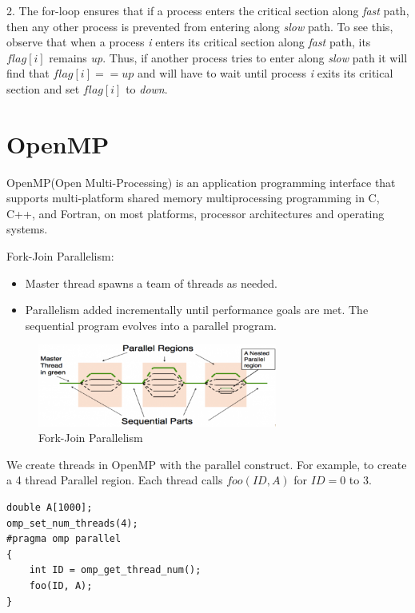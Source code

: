 \documentclass[twoside]{article}
\begin{document}
\setlength{\parindent}{2em} 2. The for-loop ensures that if a process enters the critical section along {\it fast} path, then any other process is prevented from entering along {\it slow} path. To see this, observe that when a process {\it i} enters its critical section along {\it fast} path, its $flag[i]$ remains {\it up}. Thus, if another process tries to enter along {\it slow} path it will find that $flag[i] == up$ and will have to wait until process {\it i} exits its critical section and set $flag[i]$ to {\it down}.

\section{OpenMP}
OpenMP(Open Multi-Processing) is an application programming interface that supports multi-platform shared memory multiprocessing programming in C, C++, and Fortran, on most platforms, processor architectures and operating systems.

Fork-Join Parallelism:
\begin{itemize}
    \item Master thread spawns a team of threads as needed.
    \item Parallelism added incrementally until performance goals are met. The sequential program evolves into a parallel program.
\end{itemize}
\begin{figure}[!ht]
  \centering
    \includegraphics[width=0.7\textwidth]{0.png}
  \caption{Fork-Join Parallelism}
\end{figure}


We create threads in OpenMP with the parallel construct. For example, to create a 4 thread Parallel region. Each thread calls $foo(ID, A)$ for $ID = 0$ to 3.


\begin{center}
\begin{lstlisting}[linewidth=17cm]
double A[1000];
omp_set_num_threads(4);
#pragma omp parallel
{
    int ID = omp_get_thread_num();
    foo(ID, A);
}
\end{lstlisting}
\end{center}
\end{document}
